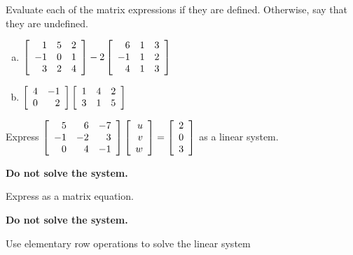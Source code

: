 \documentclass[11pt, legalpaper]{exam}
\begin{document}
\addpoints

\noindent
\begin{center}
\gradetable[v][pages]  %
\end{center}


\newpage %

%
%
%

\begin{questions}
\question[4] Evaluate each of the matrix expressions if they are defined.  Otherwise, say that they are undefined.
\begin{enumerate}[(a)]
\item $\MATRIX{rrr}{1 & 5 & 2\\-1 & 0 & 1\\3 & 2 & 4} - 2\MATRIX{rrr}{6 & 1 & 3\\-1 & 1 & 2\\4 & 1 & 3}$
\vfill

\item $\MATRIX{rr}{4 & -1\\0 & 2}\MATRIX{rrr}{1 & 4 & 2\\3 & 1 & 5}$
\vfill
\end{enumerate}

\question[1] Express $\MATRIX{rrr}{5 & 6 & -7\\-1 & -2 & 3\\0 & 4 & -1}\COLUMN{u\\v\\w} = \COLUMN{2\\0\\3}$ as a linear system.

\textbf{Do not solve the system.}
\vfill

\question[2] Express  as a matrix equation.

\textbf{Do not solve the system.}
\vfill

\newpage

\question[4] Use elementary row operations to solve the linear system 


\end{questions}
\end{document}
